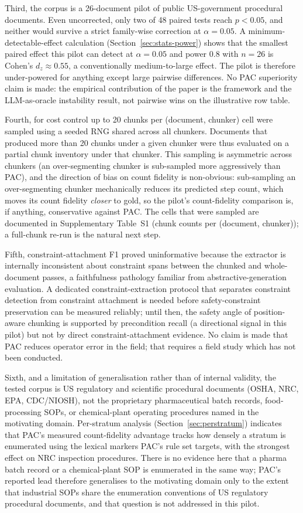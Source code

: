 \documentclass[make,article,submit,oneauthor,pdftex]{Definitions/mdpi}
\begin{document}
Third, the corpus is a 26-document pilot of public US-government
procedural documents. Even uncorrected, only two of 48 paired tests
reach $p<0.05$, and neither would survive a strict family-wise
correction at $\alpha=0.05$. A minimum-detectable-effect calculation
(Section~\ref{sec:stats-power}) shows that the smallest paired
effect this pilot can detect at $\alpha=0.05$ and power $0.8$ with
$n=26$ is Cohen's $d_z\approx0.55$, a conventionally medium-to-large
effect. The pilot is therefore under-powered for anything except
large pairwise differences. No PAC superiority claim is made: the
empirical contribution of the paper is the framework and the
LLM-as-oracle instability result, not pairwise wins on the
illustrative row table.

Fourth, for cost control up to 20 chunks per (document, chunker) cell
were sampled using a seeded RNG shared across all chunkers. Documents
that produced more than 20 chunks under a given chunker were thus
evaluated on a partial chunk inventory under that chunker. This
sampling is asymmetric across chunkers (an over-segmenting chunker is
sub-sampled more aggressively than PAC), and the direction of bias on
count fidelity is non-obvious: sub-sampling an over-segmenting chunker
mechanically reduces its predicted step count, which moves its count
fidelity \emph{closer} to gold, so the pilot's count-fidelity
comparison is, if anything, conservative against PAC. The cells that
were sampled are documented in Supplementary Table~S1 (chunk counts
per (document, chunker)); a full-chunk re-run is the natural next
step.

Fifth, constraint-attachment F1 proved uninformative because the
extractor is internally inconsistent about constraint spans between the
chunked and whole-document passes, a faithfulness pathology familiar
from abstractive-generation evaluation\cite{maynez2020faithfulness}. A
dedicated constraint-extraction protocol that separates constraint
detection from constraint attachment is needed before safety-constraint
preservation can be measured reliably; until then, the safety angle of
position-aware chunking is supported by precondition recall (a
directional signal in this pilot) but not by direct
constraint-attachment evidence. No claim is made that PAC reduces
operator error in the field; that requires a field study which has
not been conducted.

Sixth, and a limitation of generalisation rather than of internal
validity, the tested corpus is US regulatory and scientific procedural
documents (OSHA, NRC, EPA, CDC/NIOSH), not the proprietary
pharmaceutical batch records, food-processing SOPs, or chemical-plant
operating procedures named in the motivating
domain. Per-stratum analysis (Section~\ref{sec:perstratum})
indicates that PAC's measured count-fidelity advantage tracks how
densely a stratum is enumerated using the lexical markers PAC's rule
set targets, with the strongest effect on NRC inspection procedures.
There is no evidence here that a pharma batch record or a chemical-plant
SOP is enumerated in the same way; PAC's reported lead therefore
generalises to the motivating domain only to the extent that
industrial SOPs share the enumeration conventions of US regulatory
procedural documents, and that question is not addressed in this
pilot.
\end{document}
